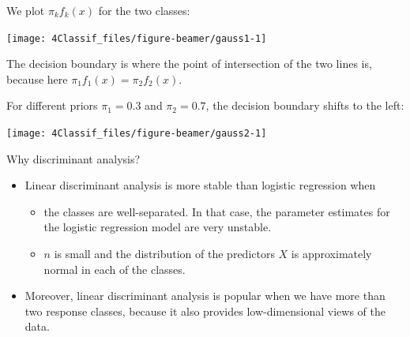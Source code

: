 \documentclass[10pt,ignorenonframetext,]{beamer}
\providecommand{\tightlist}{%
  \setlength{\itemsep}{0pt}\setlength{\parskip}{0pt}}
\begin{document}
\begin{frame}

We plot \(\pi_k f_k(x)\) for the two classes:

\begin{center}\texttt{[image: 4Classif\_files/figure-beamer/gauss1-1]} \end{center}

The decision boundary is where the point of intersection of the two
lines is, because here \(\pi_1 f_1(x)=\pi_2 f_2(x)\).

\end{frame}

\begin{frame}

For different priors \(\pi_1 = 0.3\) and \(\pi_2 = 0.7\), the decision
boundary shifts to the left:

\begin{center}\texttt{[image: 4Classif\_files/figure-beamer/gauss2-1]} \end{center}

\end{frame}

\begin{frame}

\begin{block}{Why discriminant analysis?}

\vspace{2mm}

\begin{itemize}
\item
  Linear discriminant analysis is more stable than logistic regression
  when

  \begin{itemize}
  \tightlist
  \item
    the classes are well-separated. In that case, the parameter
    estimates for the logistic regression model are very unstable.
  \item
    \(n\) is small and the distribution of the predictors \(X\) is
    approximately normal in each of the classes.
  \end{itemize}
\end{itemize}

\vspace{2mm}

\begin{itemize}
\tightlist
\item
  Moreover, linear discriminant analysis is popular when we have more
  than two response classes, because it also provides low-dimensional
  views of the data.
\end{itemize}

\end{block}

\end{frame}
\end{document}
